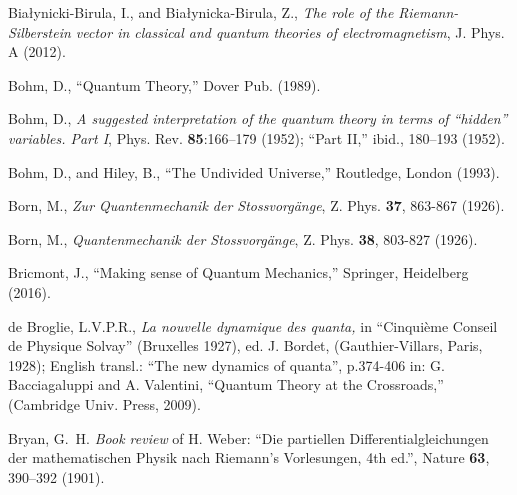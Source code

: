 \documentclass[12pt]{article}
\theoremstyle{definition}
\numberwithin{equation}{section}
\begin{document}
\begin{thebibliography}{[KTZ2020]}
        Bia{\l}ynicki-Birula, I., and  Bia{\l}ynicka-Birula, Z.,
        \textit{The role of the Riemann-Silberstein vector in classical and quantum theories of electromagnetism},
        J. Phys. A \textbf{} (2012).%

        Bohm, D.,
        ``Quantum Theory,''
        Dover Pub. (1989).\vspace{-4pt}

	Bohm, D.,
		\textit{A suggested interpretation of the quantum theory in terms of ``hidden'' variables. Part I},
	{Phys. Rev.} \textbf{85}:166--179 (1952);
	         ``Part II,''
	{ibid.}, 180--193 (1952).

        Bohm, D.,
        and 
        Hiley, B.,
        ``{The Undivided Universe},''
        Routledge, London (1993).

        Born, M.,
                 {\it Zur Quantenmechanik der Stossvorg\"ange},
        Z. Phys. {\textbf{37}},  863-867 (1926).%

        Born, M.,
                 {\it Quantenmechanik der Stossvorg\"ange},
        Z. Phys. {\textbf{38}},  803-827 (1926).%

        Bricmont, J.,
                 ``{Making sense of Quantum Mechanics},''
        Springer, Heidelberg (2016).%

        de Broglie, L.V.P.R.,
        \textit{La nouvelle dynamique des quanta,}
        in ``{Cinqui\`eme Conseil de Physique Solvay}'' (Bruxelles 1927),
        ed. J. Bordet, (Gauthier-Villars, Paris, 1928); 
        English transl.: ``The new dynamics of quanta'', p.374-406 in:
        G. Bacciagaluppi and A. Valentini,
        ``{Quantum Theory at the Crossroads},'' (Cambridge Univ. Press, 2009).  %

 Bryan, G.~H. %
  \textit{Book review} of H. Weber: ``Die partiellen Differentialgleichungen der mathematischen Physik nach Riemann's Vorlesungen,
    4th ed.'', 
    Nature \textbf{63}, 390--392 (1901). \vspace{-4pt} %


\end{thebibliography}
\end{document}
